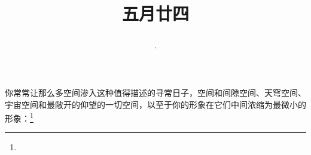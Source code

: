 \title{\date[d=29,m=6,y=2024][year:cn-y,年,month:cn,day:cn,日,·,weekday]·五月廿四 }
你常常让那么多空间渗入这种值得描述的寻常日子，空间和间隙空间、天穹空间、宇宙空间和最敞开的仰望的一切空间，以至于你的形象在它们中间浓缩为最微小的形象：\footnote{ }

